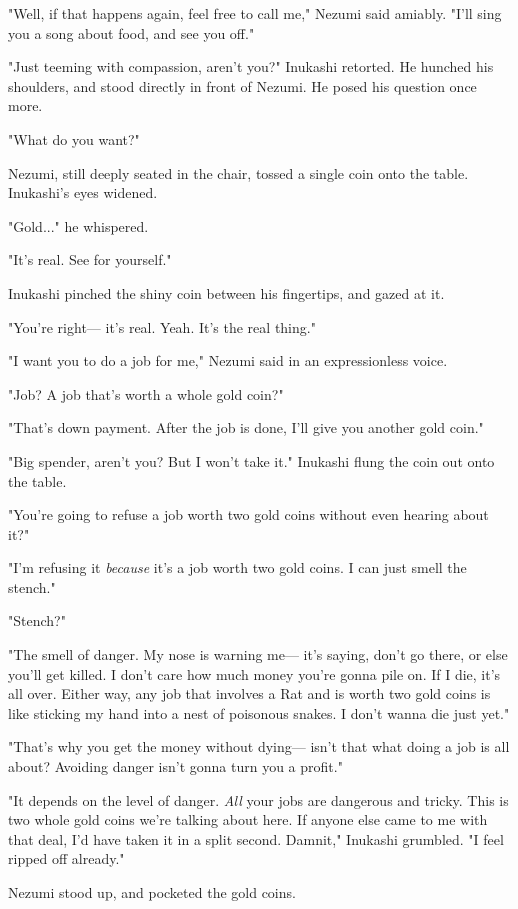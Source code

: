 "Well, if that happens again, feel free to call me," Nezumi said
amiably. "I'll sing you a song about food, and see you off."

"Just teeming with compassion, aren't you?" Inukashi retorted. He
hunched his shoulders, and stood directly in front of Nezumi. He posed
his question once more.

"What do you want?"

Nezumi, still deeply seated in the chair, tossed a single coin onto the
table. Inukashi's eyes widened.

"Gold..." he whispered.

"It's real. See for yourself."

Inukashi pinched the shiny coin between his fingertips, and gazed at it.

"You're right--- it's real. Yeah. It's the real thing."

"I want you to do a job for me," Nezumi said in an expressionless voice.

"Job? A job that's worth a whole gold coin?"

"That's down payment. After the job is done, I'll give you another gold
coin."

"Big spender, aren't you? But I won't take it." Inukashi flung the coin
out onto the table.

"You're going to refuse a job worth two gold coins without even hearing
about it?"

"I'm refusing it \emph{because} it's a job worth two gold coins. I can just
smell the stench."

"Stench?"

"The smell of danger. My nose is warning me--- it's saying, don't go
there, or else you'll get killed. I don't care how much money you're
gonna pile on. If I die, it's all over. Either way, any job that
involves a Rat and is worth two gold coins is like sticking my hand into
a nest of poisonous snakes. I don't wanna die just yet."

"That's why you get the money without dying--- isn't that what doing a job
is all about? Avoiding danger isn't gonna turn you a profit."

"It depends on the level of danger. \emph{All} your jobs are dangerous and
tricky. This is two whole gold coins we're talking about here. If anyone
else came to me with that deal, I'd have taken it in a split second.
Damnit," Inukashi grumbled. "I feel ripped off already."

Nezumi stood up, and pocketed the gold coins.

